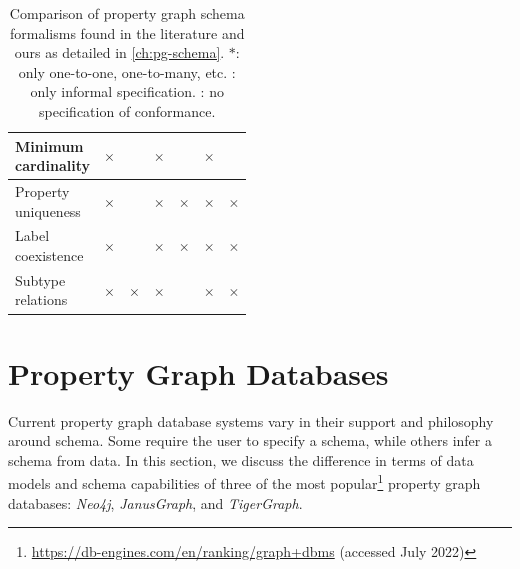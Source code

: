 \documentclass{report}
\theoremstyle{definition}
\newcommand{\yes}{\cellcolor{lightgreen}\color{green}\checkmark}
\newcommand{\no}{\cellcolor{lightred}\color{red}$\times$}
\begin{document}
\begin{table}[t]
\begin{tabular}{lcccccc}
    \hline
    \makecell[l]{Minimum                                                                                                                                                                        \\cardinality}     & \no                & \yes                 & \no                 & \yes*                 & \no          & \yes \\
    \hline
    \makecell[l]{Property                                                                                                                                                                       \\uniqueness}    & \no               & \yes                & \no                 & \no                & \no           & \no \\
    \hline
    \makecell[l]{Label                                                                                                                                                                          \\coexistence} & \no                & \yes                & \no                 & \no                 & \no           & \no \\
    \hline
    \makecell[l]{Subtype                                                                                                                                                                        \\relations} & \no                & \no                 & \no                 & \yes                 & \no           & \no \\
    \hline
  \end{tabular}
  \caption[Comparison of property graph schema formalisms found in the literature and ours]{Comparison of property graph schema formalisms found in the literature and ours as detailed in \autoref{ch:pg-schema}. $*$: only one-to-one, one-to-many, etc. \textdagger: only informal specification. {\footnotesize \textdaggerdbl}: no specification of conformance.}
  \label{tab:pg-schema-literature}
\end{table}

\section{Property Graph Databases}

Current property graph database systems vary in their support and philosophy around schema. Some require the user to specify a schema, while others infer a schema from data. In this section, we discuss the difference in terms of data models and schema capabilities of three of the most popular\footnote{\url{https://db-engines.com/en/ranking/graph+dbms} (accessed July 2022)} property graph databases: \emph{Neo4j}, \emph{JanusGraph}, and \emph{TigerGraph}.
\end{document}
